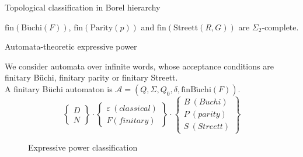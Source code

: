 \documentclass[svgnames]{beamer}
\newcommand{\fin}{\mathrm{fin}}
\newcommand{\bucf}{\mathrm{B\ddot{u}chi}(F)}
\newcommand{\parp}{\mathrm{Parity}(p)}
\newcommand{\streettrg}{\mathrm{Streett}(R,G)}
\newcommand{\A}{\mathcal{A}}
\newcommand{\omegareg}{\omega\mathrm{-reg}}
\newcommand{\DB}{\mathit{DB}}
\newcommand{\DFB}{\mathit{DFB}}
\newcommand{\DFP}{\mathit{DFP}}
\newcommand{\DFS}{\mathit{DFS}}
\newcommand{\NFB}{\mathit{NFB}}
\newcommand{\NFP}{\mathit{NFP}}
\newcommand{\NFS}{\mathit{NFS}}
\begin{document}
\begin{frame}{Topological classification in Borel hierarchy}


\begin{theorem}
$\fin(\bucf)$, $\fin(\parp)$ and $\fin(\streettrg)$ are $\Sigma_2$-complete.
\end{theorem}
\end{frame}

\begin{frame}{Automata-theoretic expressive power}

We consider automata over infinite words, 
whose acceptance conditions are finitary B\"uchi, finitary parity or
finitary Streett.\\
\pause
A finitary B\"uchi automaton is $\A = (Q, \Sigma, Q_0, \delta, \fin\bucf)$.
\pause
$$\left \{ \begin{array}{c} D \\ N \end{array} \right \} \cdot
\left \{ \begin{array}{c} \varepsilon\ (classical) \\ F (finitary) 
\end{array} \right \} \cdot
\left \{ \begin{array}{c} B\ (B\ddot{u}chi) \\ P\ (parity) \\ S\ (Streett) 
\end{array} \right \}$$
\end{frame}

\begin{frame}{}
\begin{figure}
\centering
{}
\caption{Expressive power classification}\label{fig_automata}
\end{figure}
\end{frame}
\end{document}
